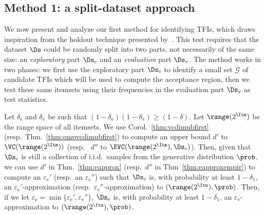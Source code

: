 \subsection{Method 1: a split-dataset approach}\label{sec:holdout}

We now present and analyze our first method for identifying TFIs, which draws
inspiration from the holdout technique presented by~\citet{Webb07}. This test
requires that the dataset $\Ds$ could be randomly split into two
parts, not necessarily of the same size: an \emph{exploratory} part
$\Ds_\mathrm{e}$ and an \emph{evaluation} part $\Ds_\mathrm{v}$. 
The method works in two phases: we first use the exploratory part
$\Ds_\mathrm{e}$ to identify a small set $\mathcal{G}$ of candidate TFIs which will be used to
compute the acceptance region, then we test these same itemsets using their
frequencies in the evaluation part $\Ds_\mathrm{v}$ as test statistics.

Let $\delta_\mathrm{e}$ and $\delta_\mathrm{v}$ be such that
$(1-\delta_\mathrm{e})(1-\delta_\mathrm{v})\ge(1-\delta)$. Let $\range(2^\Itm)$
be the range space of all itemsets.
We use Corol.~\ref{thm:vcdimubfirst} (resp.~Thm.~\ref{thm:empvcdimubfirst}) to
compute an upper bound $d'$ to $\VC(\range(2^\Itm))$ (resp.~ $d''$ to
$\EVC(\range(2^\Itm),\Ds_\mathrm{e})$). Then, given that $\Ds_\mathrm{e}$ is
still a collection of i.i.d.~samples from the generative distribution $\prob$,
we can use $d'$ in Thm.~\ref{thm:eapprox} (resp.~$d''$ in
Thm~\ref{thm:eapproxempir}) to compute an $\varepsilon_\mathrm{e}'$ (resp.~an
$\varepsilon_\mathrm{e}''$) such that $\Ds_\mathrm{e}$ is, with probability at
least $1-\delta_1$, an $\varepsilon_\mathrm{e}'$-approximation
(resp.~$\varepsilon_\mathrm{e}''$-approximation) to $(\range(2^\Itm),\prob)$.
Then, if we let
$\varepsilon_\mathrm{e}=\min\{\varepsilon_\mathrm{e}',\varepsilon_\mathrm{e}''\}$,
$\Ds_\mathrm{e}$ is, with probability at least $1-\delta_1$, an
$\varepsilon_\mathrm{e}$-approximation to $(\range(2^\Itm),\prob)$.

